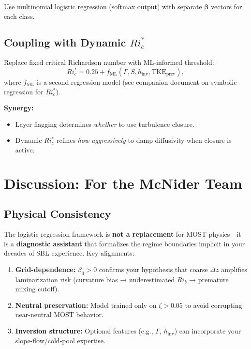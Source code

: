 \documentclass[11pt]{article}
\begin{document}
Use multinomial logistic regression (softmax output) with separate $\boldsymbol{\beta}$ vectors for each class.

\subsection{Coupling with Dynamic $Ri_c^*$}

Replace fixed critical Richardson number with ML-informed threshold:
\begin{equation}
Ri_c^* = 0.25 + f_{\text{ML}}(\Gamma, S, h_{\text{inv}}, \text{TKE}_{\text{prev}}),
\label{eq:dynamic_Ric}
\end{equation}
where $f_{\text{ML}}$ is a second regression model (see companion document on symbolic regression for $Ri_c^*$).

\textbf{Synergy:}
\begin{itemize}[leftmargin=*]
\item Layer flagging determines \emph{whether} to use turbulence closure.
\item Dynamic $Ri_c^*$ refines \emph{how aggressively} to damp diffusivity when closure is active.
\end{itemize}

\section{Discussion: For the McNider Team}

\subsection{Physical Consistency}

The logistic regression framework is \textbf{not a replacement} for MOST physics---it is a \textbf{diagnostic assistant} that formalizes the regime boundaries implicit in your decades of SBL experience. Key alignments:

\begin{enumerate}[leftmargin=*]
\item \textbf{Grid-dependence:} $\beta_3 > 0$ confirms your hypothesis that coarse $\Delta z$ amplifies laminarization risk (curvature bias → underestimated $Ri_b$ → premature mixing cutoff).
\item \textbf{Neutral preservation:} Model trained only on $\zeta > 0.05$ to avoid corrupting near-neutral MOST behavior.
\item \textbf{Inversion structure:} Optional features (e.g., $\Gamma$, $h_{\text{inv}}$) can incorporate your slope-flow/cold-pool expertise.
\end{enumerate}
\end{document}
